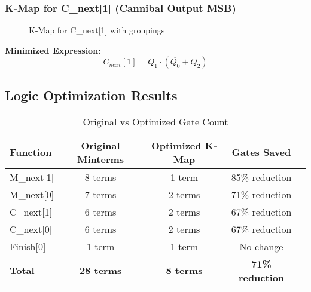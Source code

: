 \documentclass[12pt,letterpaper]{article}
\begin{document}
\subsubsection{K-Map for C\_next[1] (Cannibal Output MSB)}
\begin{figure}[H]
\centering
{}
\caption{K-Map for C\_next[1] with groupings}
\label{fig:kmap_c1}
\end{figure}

\textbf{Minimized Expression:}
\begin{equation}
C_{next}[1] = Q_1 \cdot (\overline{Q_0} + Q_2)
\end{equation}

\subsection{Logic Optimization Results}

\begin{table}[H]
\centering
\caption{Original vs Optimized Gate Count}
\begin{tabular}{@{}lcccc@{}}
\toprule
\textbf{Function} & \textbf{Original Minterms} & \textbf{Optimized K-Map} & \textbf{Gates Saved} \\
\midrule
M\_next[1] & 8 terms & 1 term & 85\% reduction \\
M\_next[0] & 7 terms & 2 terms & 71\% reduction \\
C\_next[1] & 6 terms & 2 terms & 67\% reduction \\
C\_next[0] & 6 terms & 2 terms & 67\% reduction \\
Finish[0] & 1 term & 1 term & No change \\
\midrule
\textbf{Total} & \textbf{28 terms} & \textbf{8 terms} & \textbf{71\% reduction} \\
\bottomrule
\end{tabular}
\label{tab:optimization}
\end{table}
\end{document}
